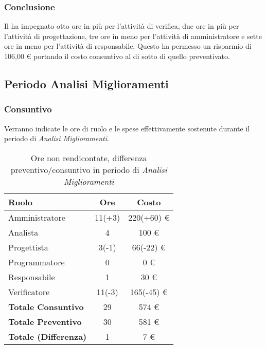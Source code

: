 \subsubsection{Conclusione}
Il  ha impegnato otto ore in pi\`u per l'attivit\`a di verifica, due ore in pi\`u per l'attivit\`a di progettazione, tre ore in meno per l'attivit\`a di amministratore e sette ore in meno per l'attivit\`a di responsabile. Questo ha permesso un risparmio di 106,00 \euro{} portando il costo consuntivo al di sotto di quello preventivato.

\newpage


\subsection{Periodo Analisi Miglioramenti}
\subsubsection{Consuntivo}
Verranno indicate le ore di ruolo e le spese effettivamente sostenute durante il periodo di \textit{Analisi Miglioramenti}.

\begin{table}[H]
	\centering
	\begin{tabular}{ l c c }
		\textbf{Ruolo} & \textbf{Ore} & \textbf{Costo} \\
		\hline
		Amministratore & 11(+3) & 220(+60) \euro{} \\
		Analista & 4 & 100 \euro{} \\
		Progettista & 3(-1) & 66(-22) \euro{} \\
		Programmatore & 0 & 0 \euro{} \\
		Responsabile & 1 & 30 \euro{} \\
		Verificatore & 11(-3) & 165(-45) \euro{} \\
		\hline
		\textbf{Totale Consuntivo} & 29 & 574 \euro{} \\
		\hline
		\textbf{Totale Preventivo} & 30 & 581 \euro{} \\
		\hline
		\textbf{Totale (Differenza)} & 1 & 7 \euro{} \\
		\hline
	\end{tabular}
	\caption{Ore non rendicontate, differenza preventivo/consuntivo in periodo di \textit{Analisi Miglioramenti}}
\end{table}



